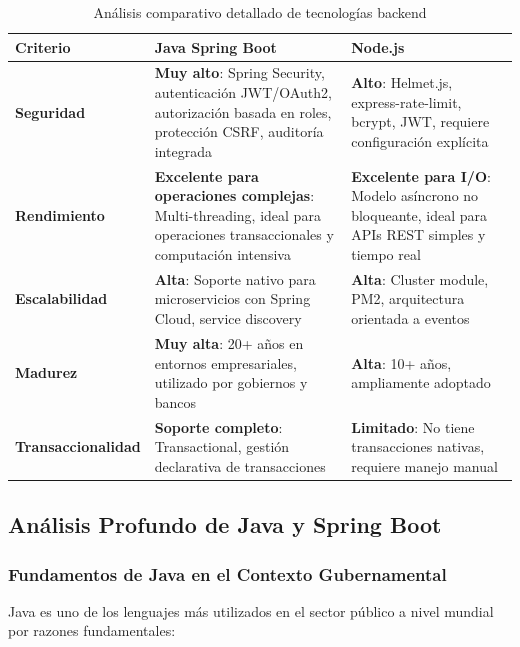 \begin{table}[htbp]
\centering
\caption{Análisis comparativo detallado de tecnologías backend}
\label{tab:comparativa-backend}
\small
\begin{tabular}{|p{2.5cm}|p{4cm}|p{4cm}|}
\hline
\textbf{Criterio} & \textbf{Java Spring Boot} & \textbf{Node.js} \\
\hline
\textbf{Seguridad} & \textbf{Muy alto}: Spring Security, autenticación JWT/OAuth2, autorización basada en roles, protección CSRF, auditoría integrada & \textbf{Alto}: Helmet.js, express-rate-limit, bcrypt, JWT, requiere configuración explícita \\
\hline
\textbf{Rendimiento} & \textbf{Excelente para operaciones complejas}: Multi-threading, ideal para operaciones transaccionales y computación intensiva & \textbf{Excelente para I/O}: Modelo asíncrono no bloqueante, ideal para APIs REST simples y tiempo real \\
\hline
\textbf{Escalabilidad} & \textbf{Alta}: Soporte nativo para microservicios con Spring Cloud, service discovery & \textbf{Alta}: Cluster module, PM2, arquitectura orientada a eventos \\
\hline
\textbf{Madurez} & \textbf{Muy alta}: 20+ años en entornos empresariales, utilizado por gobiernos y bancos & \textbf{Alta}: 10+ años, ampliamente adoptado \\
\hline
\textbf{Transaccionalidad} & \textbf{Soporte completo}: Transactional, gestión declarativa de transacciones & \textbf{Limitado}: No tiene transacciones nativas, requiere manejo manual \\
\hline
\end{tabular}
\end{table}

\subsection{Análisis Profundo de Java y Spring Boot}

\subsubsection{Fundamentos de Java en el Contexto Gubernamental}

Java es uno de los lenguajes más utilizados en el sector público a nivel mundial por razones fundamentales:

